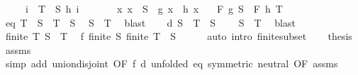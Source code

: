 \begin{isabellebody}
\ \ \ \ \ {\isachardoublequoteopen}{\isasymforall}i\ {\isasymin}\ T\ {\isacharminus}{\kern0pt}\ S{\isachardot}{\kern0pt}\ h\ i\ {\isacharequal}{\kern0pt}\ \isanewline
\ \ \ \ \ {\isachardoublequoteopen}{\isasymAnd}x{\isachardot}{\kern0pt}\ x\ {\isasymin}\ S\ {\isasymLongrightarrow}\ g\ x\ {\isacharequal}{\kern0pt}\ h\ x{\isachardoublequoteclose}\isanewline
\ \ \ {\isachardoublequoteopen}F\ g\ S\ {\isacharequal}{\kern0pt}\ F\ h\ T{\isachardoublequoteclose}\isanewline
%
\isadelimproof
%
\endisadelimproof
%
\isatagproof
{}\isamarkupfalse%
{\isacharminus}{\kern0pt}\isanewline
\ \ \isamarkupfalse%
\ eq{\isacharcolon}{\kern0pt}\ {\isachardoublequoteopen}T\ {\isacharequal}{\kern0pt}\ S\ {\isasymunion}\ {\isacharparenleft}{\kern0pt}T\ {\isacharminus}{\kern0pt}\ S{\isacharparenright}{\kern0pt}{\isachardoublequoteclose}\ \isamarkupfalse%
\ {\isacartoucheopen}S\ {\isasymsubseteq}\ T{\isacartoucheclose}\ \isamarkupfalse%
\ blast\isanewline
\ \ \isamarkupfalse%
\ d{\isacharcolon}{\kern0pt}\ {\isachardoublequoteopen}S\ {\isasyminter}\ {\isacharparenleft}{\kern0pt}T\ {\isacharminus}{\kern0pt}\ S{\isacharparenright}{\kern0pt}\ {\isacharequal}{\kern0pt}\ {\isacharbraceleft}{\kern0pt}{\isacharbraceright}{\kern0pt}{\isachardoublequoteclose}\ \isamarkupfalse%
\ {\isacartoucheopen}S\ {\isasymsubseteq}\ T{\isacartoucheclose}\ \isamarkupfalse%
\ blast\isanewline
\ \ \isamarkupfalse%
\ {\isacartoucheopen}finite\ T{\isacartoucheclose}\ {\isacartoucheopen}S\ {\isasymsubseteq}\ T{\isacartoucheclose}\ \isamarkupfalse%
\ f{\isacharcolon}{\kern0pt}\ {\isachardoublequoteopen}finite\ S{\isachardoublequoteclose}\ {\isachardoublequoteopen}finite\ {\isacharparenleft}{\kern0pt}T\ {\isacharminus}{\kern0pt}\ S{\isacharparenright}{\kern0pt}{\isachardoublequoteclose}\isanewline
\ \ \ \ \isamarkupfalse%
\ {\isacharparenleft}{\kern0pt}auto\ intro{\isacharcolon}{\kern0pt}\ finite{\isacharunderscore}{\kern0pt}subset{\isacharparenright}{\kern0pt}\isanewline
\ \ \isamarkupfalse%
\ {\isacharquery}{\kern0pt}thesis\ \isamarkupfalse%
\ assms{\isacharparenleft}{\kern0pt}{}{\isacharparenright}{\kern0pt}\isanewline
\ \ \ \ \isamarkupfalse%
\ {\isacharparenleft}{\kern0pt}simp\ add{\isacharcolon}{\kern0pt}\ union{\isacharunderscore}{\kern0pt}disjoint\ {\isacharbrackleft}{\kern0pt}OF\ f\ d{\isacharcomma}{\kern0pt}\ unfolded\ eq\ {\isacharbrackleft}{\kern0pt}symmetric{\isacharbrackright}{\kern0pt}{\isacharbrackright}{\kern0pt}\ neutral\ {\isacharbrackleft}{\kern0pt}OF\ assms{\isacharparenleft}{\kern0pt}{}{\isacharparenright}{\kern0pt}{\isacharbrackright}{\kern0pt}{\isacharparenright}{\kern0pt}\isanewline

\end{isabellebody}
